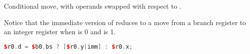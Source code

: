 \noindent Conditional move, with operands swapped with respect to .

Notice that the immediate version of  reduces to a move from a
branch register to an integer register when  is 0 and  is 1.

\begin{lstlisting}[numbers=none, basicstyle=\ttfamily\footnotesize, language=C++]
$r0.d = $b0.bs ? [$r0.y|imm] : $r0.x;
\end{lstlisting}

\vskip 10pt
\noindent\begin{minipage}{\textwidth}
\label{opc:MAX}
\noindent\textbf{\footnotesize\texttt{}}

\noindent\textbf{\footnotesize\texttt{}}


\end{minipage}

